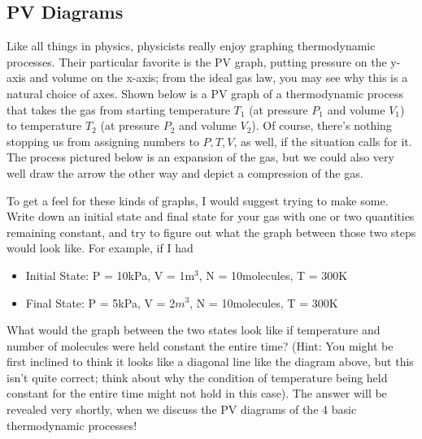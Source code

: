 \subsection{PV Diagrams}
Like all things in physics, physicists really enjoy graphing thermodynamic processes. Their particular favorite is the PV graph, putting pressure on the y-axis and volume on the x-axis; from the ideal gas law, you may see why this is a natural choice of axes. Shown below is a PV graph of a thermodynamic process that takes the gas from starting temperature $T_1$ (at pressure $P_1$ and volume $V_1$) to temperature $T_2$ (at pressure $P_2$ and volume $V_2$). Of course, there's nothing stopping us from assigning numbers to $P,T,V$, as well, if the situation calls for it. The process pictured below is an expansion of the gas, but we could also very well draw the arrow the other way and depict a compression of the gas. 
\begin{center}
 \end{center}
 To get a feel for these kinds of graphs, I would suggest trying to make some. Write down an initial state and final state for your gas with one or two quantities remaining constant, and try to figure out what the graph between those two steps would look like. For example, if I had
\begin{itemize}
    \item Initial State: P = 10kPa, V = 1m$^3$, N = 10molecules, T = 300K
    \item Final State: P = 5kPa, V = 2$m^3$, N = 10molecules, T = 300K
\end{itemize}
What would the graph between the two states look like if temperature and number of molecules were held constant the entire time? (Hint: You might be first inclined to think it looks like a diagonal line like the diagram above, but this isn't quite correct; think about why the condition of temperature being held constant for the entire time might not hold in this case). The answer will be revealed very shortly, when we discuss the PV diagrams of the 4 basic thermodynamic processes! \\
